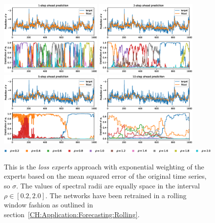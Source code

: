 \begin{figure}
    \begin{center}
        \includegraphics[width=0.45\textwidth]{Plots/Prediction/Experts_MSE_rolling_1step.eps}
        \includegraphics[width=0.45\textwidth]{Plots/Prediction/Experts_MSE_rolling_2step.eps} \\
        \includegraphics[width=0.45\textwidth]{Plots/Prediction/Experts_MSE_rolling_5step.eps}
        \includegraphics[width=0.45\textwidth]{Plots/Prediction/Experts_MSE_rolling_10step.eps} \\
        \includegraphics[width=1.0\textwidth]{Plots/Prediction/legend_experts.eps}
    \end{center}
    \caption{This is the \textit{loss experts} approach with exponential weighting of the experts based on the mean squared error of the original time series, so $\sigma$. The values of spectral radii are equally space in the interval $\rho \in [0.2, 2.0]$. The networks have been retrained in a rolling window fashion as outlined in section \ref{CH:Application:Forecasting:Rolling}.}
    \label{FIG:ExpertsMSERolling}
\end{figure}

